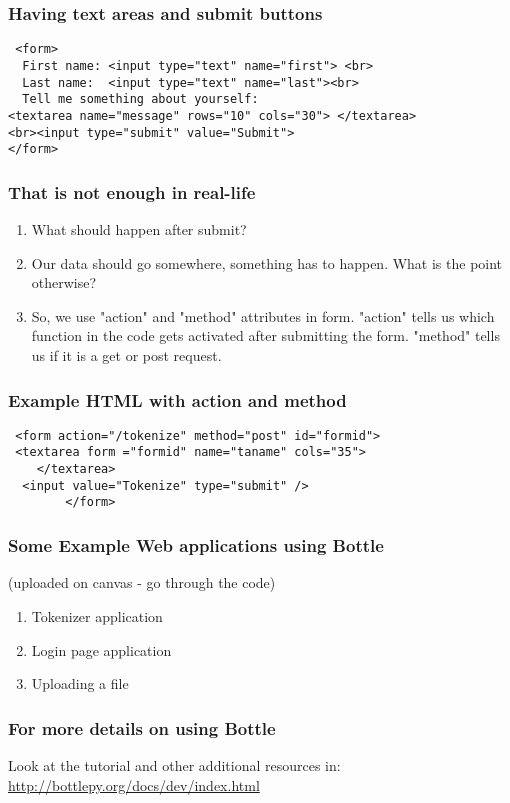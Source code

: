 \documentclass{beamer}
\begin{document}
\begin{frame}[fragile]
\frametitle{Having text areas and submit buttons}
\begin{verbatim}
 <form>
  First name: <input type="text" name="first"> <br>
  Last name:  <input type="text" name="last"><br>
  Tell me something about yourself: 
<textarea name="message" rows="10" cols="30"> </textarea>
<br><input type="submit" value="Submit">
</form> 
\end{verbatim}
\end{frame}

\begin{frame}
\frametitle{That is not enough in real-life}
\begin{enumerate}
\item What should happen after submit? \pause
\item Our data should go somewhere, something has to happen. What is the point otherwise? \pause
\item So, we use "action" and "method" attributes in form. "action" tells us which function in the code gets activated after submitting the form. "method" tells us if it is a get or post request.
\end{enumerate}
\end{frame}

\begin{frame}[fragile]
\frametitle{Example HTML with action and method}
\begin{verbatim}
 <form action="/tokenize" method="post" id="formid">
 <textarea form ="formid" name="taname" cols="35">
	</textarea>
  <input value="Tokenize" type="submit" />
        </form>
\end{verbatim}
\end{frame}

\begin{frame}
\frametitle{Some Example Web applications using Bottle}
(uploaded on canvas - go through the code)
\begin{enumerate}
\item Tokenizer application
\item Login page application
\item Uploading a file
\end{enumerate}
\end{frame}

\begin{frame}
\frametitle{For more details on using Bottle}
Look at the tutorial and other additional resources in: \\ \url{http://bottlepy.org/docs/dev/index.html}
\end{frame}
\end{document}
